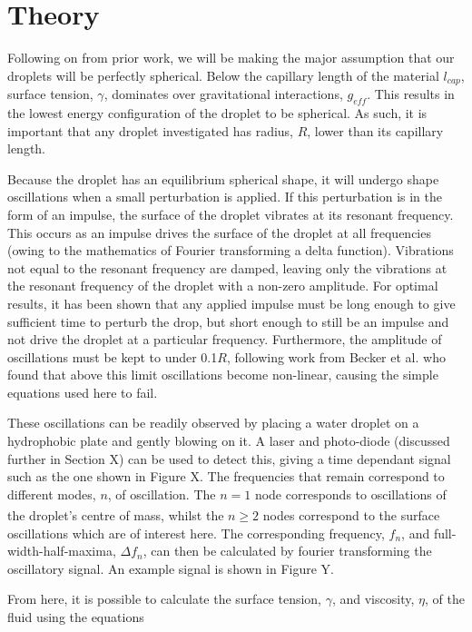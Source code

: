 \documentclass{physics_article_B}
\begin{document}
\section{Theory\label{sect:theory}}

    Following on from prior work, we will be making the major assumption that our droplets will be perfectly spherical. Below the capillary length of the material $l_{cap}$, surface tension, $\gamma$, dominates over gravitational interactions, $g_{eff}$. This results in the lowest energy configuration of the droplet to be spherical. As such, it is important that any droplet investigated has radius, $R$, lower than its capillary length. 
    
    Because the droplet has an equilibrium spherical shape, it will undergo shape oscillations when a small perturbation is applied\cite{oscillate}. If this perturbation is in the form of an impulse, the surface of the droplet vibrates at its resonant frequency. This occurs as an impulse drives the surface of the droplet at all frequencies (owing to the mathematics of Fourier transforming a delta function). Vibrations not equal to the resonant frequency are damped, leaving only the vibrations at the resonant frequency of the droplet with a non-zero amplitude. For optimal results, it has been shown that any applied impulse must be long enough to give sufficient time to perturb the drop, but short enough to still be an impulse and not drive the droplet at a particular frequency\cite{temperton}. Furthermore, the amplitude of oscillations must be kept to under 0.1$R$, following work from Becker et al. who found that above this limit oscillations become non-linear, causing the simple equations used here to fail\cite{becker}.
    
    These oscillations can be readily observed by placing a water droplet on a hydrophobic plate and gently blowing on it. A laser and photo-diode (discussed further in Section X) can be used to detect this, giving a time dependant signal such as the one shown in Figure X. The frequencies that remain correspond to different modes, $n$, of oscillation. The $n=1$ node corresponds to oscillations of the droplet's centre of mass\textsuperscript{\cite{miller}}, whilst the $n\geq2$ nodes correspond to the surface oscillations which are of interest here. The corresponding frequency, $f_n$, and full-width-half-maxima, $\Delta f_n$, can then be calculated by fourier transforming the oscillatory signal. An example signal is shown in Figure Y. 
    
    From here, it is possible to calculate the surface tension, $\gamma$, and viscosity, $\eta$, of the fluid using the equations
 
\end{document}
